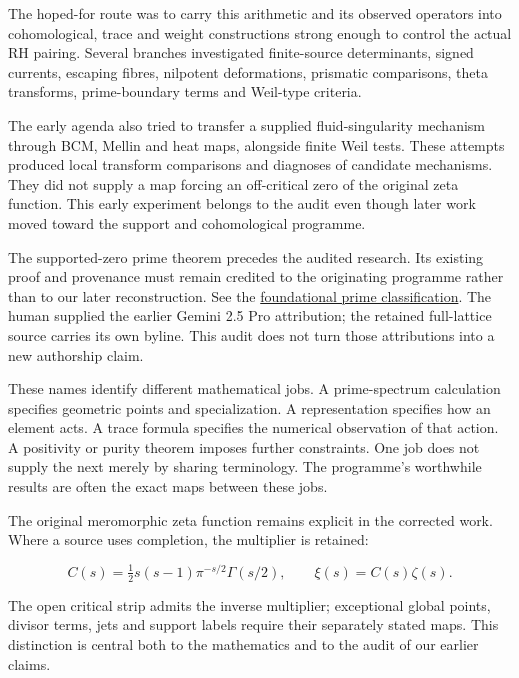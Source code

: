 \documentclass[
  british,
  11pt,
  a4paper,
]{article}
\begin{document}
The hoped-for route was to carry this arithmetic and its observed
operators into cohomological, trace and weight constructions strong
enough to control the actual RH pairing. Several branches investigated
finite-source determinants, signed currents, escaping fibres, nilpotent
deformations, prismatic comparisons, theta transforms, prime-boundary
terms and Weil-type criteria.

The early agenda also tried to transfer a supplied fluid-singularity
mechanism through BCM, Mellin and heat maps, alongside finite Weil
tests. These attempts produced local transform comparisons and diagnoses
of candidate mechanisms. They did not supply a map forcing an
off-critical zero of the original zeta function. This early experiment
belongs to the audit even though later work moved toward the support and
cohomological programme.

The supported-zero prime theorem precedes the audited research. Its
existing proof and provenance must remain credited to the originating
programme rather than to our later reconstruction. See the
\href{https://github.com/KokunoYumeto/zeta-function-research-reader/blob/d2f0020a7c446f429682925c1c682d99ba86a4cc/workbenches/splitzero-tandem/foundations/globalization-semiring/globalization_note.tex\#L239}{foundational
prime classification}. The human supplied the earlier Gemini 2.5 Pro
attribution; the retained full-lattice source carries its own byline.
This audit does not turn those attributions into a new authorship claim.

These names identify different mathematical jobs. A prime-spectrum
calculation specifies geometric points and specialization. A
representation specifies how an element acts. A trace formula specifies
the numerical observation of that action. A positivity or purity theorem
imposes further constraints. One job does not supply the next merely by
sharing terminology. The programme's worthwhile results are often the
exact maps between these jobs.

The original meromorphic zeta function remains explicit in the corrected
work. Where a source uses completion, the multiplier is retained:

\[C(s)=\tfrac12s(s-1)\pi^{-s/2}\Gamma(s/2),\qquad \xi(s)=C(s)\zeta(s).\]

The open critical strip admits the inverse multiplier; exceptional
global points, divisor terms, jets and support labels require their
separately stated maps. This distinction is central both to the
mathematics and to the audit of our earlier claims.
\end{document}
